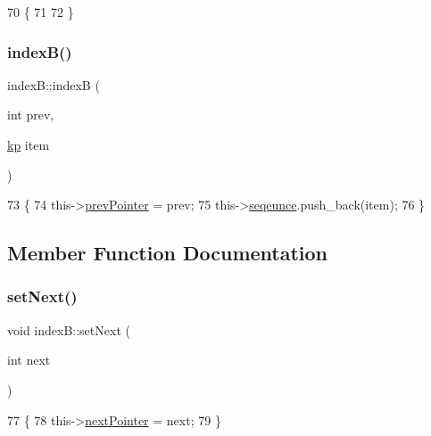 \begin{DoxyCode}
70              \{
71 
72     \}
\end{DoxyCode}
\mbox{\label{structindex_b_a60b0f681a98c7a2aabdb9f0b3f5fd32c}} 
\subsubsection{\texorpdfstring{index\+B()}{indexB()}\hspace{0.1cm}{\footnotesize\ttfamily [2/2]}}
{\footnotesize\ttfamily index\+B\+::indexB (\begin{DoxyParamCaption}\item[{int}]{prev,  }\item[{\mbox{\hyperlink{structkp}{kp}}}]{item }\end{DoxyParamCaption})\hspace{0.3cm}{\ttfamily [inline]}}


\begin{DoxyCode}
73                               \{
74         this->\mbox{\hyperlink{structindex_b_a6281f24532b9dedfefe7e2a4ce86800c}{prevPointer}} = prev;
75         this->\mbox{\hyperlink{structindex_b_a2d8b28953bea6e6bdc221993ef60864a}{seqeunce}}.push\_back(item);
76     \}
\end{DoxyCode}


\subsection{Member Function Documentation}
\mbox{\label{structindex_b_aa49ce231339be0a86b0f56f217a90772}} 
\subsubsection{\texorpdfstring{set\+Next()}{setNext()}}
{\footnotesize\ttfamily void index\+B\+::set\+Next (\begin{DoxyParamCaption}\item[{int}]{next }\end{DoxyParamCaption})\hspace{0.3cm}{\ttfamily [inline]}}


\begin{DoxyCode}
77                            \{
78         this->\mbox{\hyperlink{structindex_b_a40845f21f1bf3ba1c5c64b1065283d97}{nextPointer}} = next;
79     \}
\end{DoxyCode}
\mbox{\label{structindex_b_a66ee0af70d7b1a08658aee4cd7efb0cc}} 
